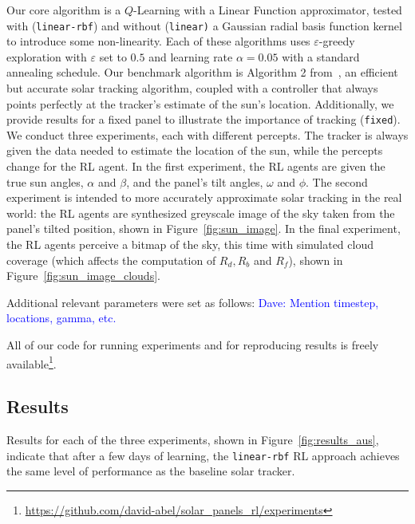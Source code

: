 \documentclass{article}
\newcommand{\dnote}[1]{\textcolor{blue}{Dave: #1}}
\begin{document}
Our core algorithm is a $Q$-Learning with a Linear Function approximator, tested with (\texttt{linear-rbf}) and without (\texttt{linear)} a Gaussian radial basis function kernel to introduce some non-linearity. Each of these algorithms uses $\varepsilon$-greedy exploration with $\varepsilon$ set to $0.5$ and learning rate $\alpha = 0.05$ with a standard annealing schedule. Our benchmark algorithm is Algorithm 2 from~\citet{Grena2012}, an efficient but accurate solar tracking algorithm, coupled with a controller that always points perfectly at the tracker's estimate of the sun's location. Additionally, we provide results for a fixed panel to illustrate the importance of tracking (\texttt{fixed}). We conduct three experiments, each with different percepts. The tracker is always given the data needed to estimate the location of the sun, while the percepts change for the RL agent. In the first experiment, the RL agents are given the true sun angles, $\alpha$ and $\beta$, and the panel's tilt angles, $\omega$ and $\phi$. The second experiment is intended to more accurately approximate solar tracking in the real world: the RL agents are synthesized greyscale image of the sky taken from the panel's tilted position, shown in Figure~\ref{fig:sun_image}. In the final experiment, the RL agents perceive a bitmap of the sky, this time with simulated cloud coverage (which affects the computation of $R_d, R_b$ and $R_f$), shown in Figure~\ref{fig:sun_image_clouds}.

Additional relevant parameters were set as follows: \dnote{Mention timestep, locations, gamma, etc.} %

All of our code for running experiments and for reproducing results is freely available\footnote{\url{https://github.com/david-abel/solar_panels_rl/experiments}}.

\subsection{Results}
Results for each of the three experiments, shown in Figure~\ref{fig:results_aus}, indicate that after a few days of learning, the \texttt{linear-rbf} RL approach achieves the same level of performance as the baseline solar tracker.
\end{document}
